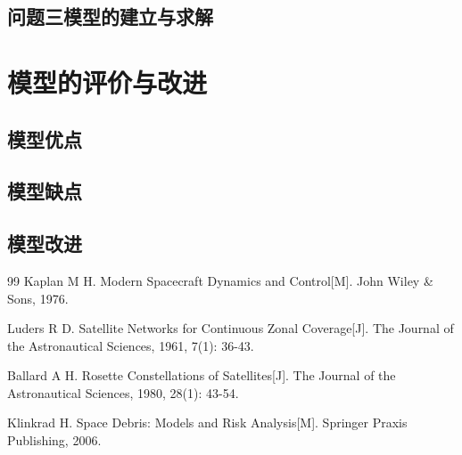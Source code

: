 \documentclass[withoutpreface,bwprint]{cumcmthesis} %
\begin{document}
\subsection{问题三模型的建立与求解}

\section{模型的评价与改进}
\subsection{模型优点}
\subsection{模型缺点}
\subsection{模型改进}
 

\begin{thebibliography}{99}%
    Kaplan M H.
    \newblock Modern Spacecraft Dynamics and Control[M].
    \newblock John Wiley \& Sons, 1976.
    
    Luders R D.
    \newblock Satellite Networks for Continuous Zonal Coverage[J].
    \newblock The Journal of the Astronautical Sciences, 1961, 7(1): 36-43.
    
    Ballard A H.
    \newblock Rosette Constellations of Satellites[J].
    \newblock The Journal of the Astronautical Sciences, 1980, 28(1): 43-54.

    Klinkrad H.
    \newblock Space Debris: Models and Risk Analysis[M].
    \newblock Springer Praxis Publishing, 2006.
\end{thebibliography}
\end{document}
